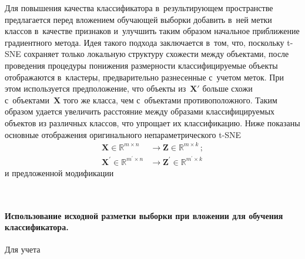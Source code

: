 \begin{multicols}{2}
Для повышения качества классификатора в~результирующем пространстве 
предлагается перед вложением обучающей выборки добавить в~ней метки 
классов в~качестве признаков и~улучшить таким образом начальное приближение 
градиентного метода. Идея такого подхода заключается в~том, что, поскольку t-SNE 
сохраняет только локальную структуру схожести между объектами, после проведения 
процедуры понижения размерности классифицируемые объекты отображаются в~клас\-те\-ры, 
предварительно разнесенные с~учетом меток. При этом используется предположение, 
что объекты из~$\mathbf{X}'$ больше схожи с~объектами~$\mathbf{X}$ того же 
класса, чем с~объектами противоположного. Таким образом удается увеличить 
расстояние между образами классифицируемых объектов из различных классов, 
что упрощает их классификацию. Ниже %
показаны основные 
отображения оригинального непараметрического t-SNE
\begin{align*}
\mathbf{X}\in\mathbb{R}^{m \times n} &\longrightarrow   
\mathbf{Z}\in\mathbb{R}^{m \times k}\,; \\
\mathbf{X^\prime}\in\mathbb{R}^{m^\prime \times n} &\longrightarrow
\mathbf{Z^\prime}\in\mathbb{R}^{m^\prime \times k}
\end{align*}
и предложенной модификации


\noindent
\begin{center}
\mbox{%
\epsfxsize=74.974mm
}
\end{center}

\vspace*{-12pt}

\paragraph*{Использование исходной разметки выборки при вложении 
для обучения классификатора.}
Для учета\linebreak\vspace*{-12pt}


\end{multicols}
